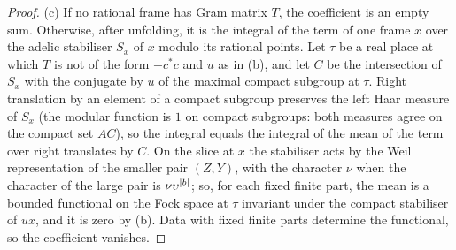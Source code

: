 \begin{proof}
(c) If no rational frame has Gram matrix $T$, the coefficient is an empty sum. Otherwise, after unfolding, it is the integral of the term of one frame $x$ over the adelic stabiliser $S_x$ of $x$ modulo its
rational points. Let $\tau$ be a real place at which $T$ is not of the form $-c^*c$ and $u$ as in (b), and let $C$ be the intersection of $S_x$ with the conjugate by $u$ of the maximal compact subgroup at $\tau$.
Right translation by an element of a compact subgroup preserves the left Haar measure of $S_x$ (the modular function is $1$ on compact subgroups: both measures agree on the compact set $AC$), so the integral
equals the integral of the mean of the term over right translates by $C$. On the slice at $x$ the stabiliser acts by the Weil representation of the smaller pair $(Z,Y)$, with the character $\nu$ when the
character of the large pair is $\nu\upsilon^{\lvert b\rvert}$; so, for each fixed finite part, the mean is a bounded functional on the Fock space at $\tau$ invariant under the compact stabiliser of $ux$, and it is zero by (b).
Data with fixed finite parts determine the functional, so the coefficient vanishes.
\end{proof}

